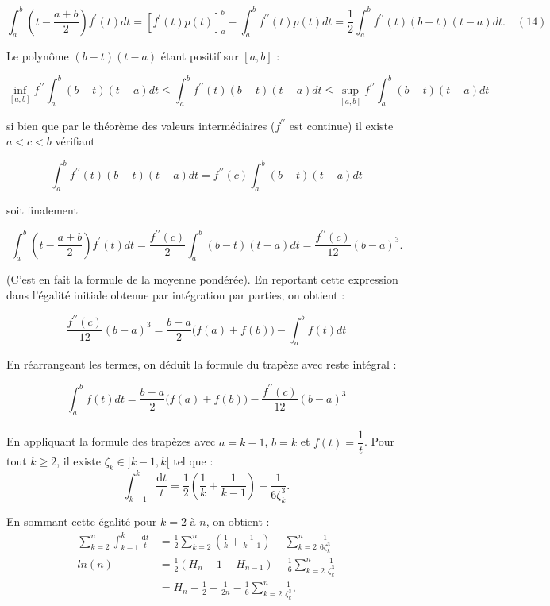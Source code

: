 \documentclass[a4paper,12pt]{article}
\begin{document}
\[
\int_{a}^{b}\left(t-\frac{a+b}{2}\right)f^{\prime}(t)dt = \left[f^{\prime}(t)p(t)\right]_{a}^{b} - \int_{a}^{b}f^{\prime\prime}(t)p(t)dt = \frac{1}{2}\int_{a}^{b}f^{\prime\prime}(t)(b-t)(t-a)dt. \quad (14)
\]

Le polynôme $(b-t)(t-a)$ étant positif sur $[a,b]$ :

\[
\inf_{[a,b]}f^{\prime\prime}\int_{a}^{b}(b-t)(t-a)dt \leq \int_{a}^{b}f^{\prime\prime}(t)(b-t)(t-a)dt \leq \sup_{[a,b]}f^{\prime\prime}\int_{a}^{b}(b-t)(t-a)dt
\]

si bien que par le théorème des valeurs intermédiaires ($f^{\prime\prime}$ est continue) il existe $a<c<b$ vérifiant

\[
\int_{a}^{b}f^{\prime\prime}(t)(b-t)(t-a)dt = f^{\prime\prime}(c)\int_{a}^{b}(b-t)(t-a)dt
\]

soit finalement

\[
\int_{a}^{b}\left(t-\frac{a+b}{2}\right)f^{\prime}(t)dt = \frac{f^{\prime\prime}(c)}{2}\int_{a}^{b}(b-t)(t-a)dt = \frac{f^{\prime\prime}(c)}{12}(b-a)^{3}.
\]



(C'est en fait la formule de la moyenne pondérée). En reportant cette expression dans l'égalité initiale obtenue par intégration par parties, on obtient :

\[
\frac{f^{\prime\prime}(c)}{12}(b-a)^3 = \frac{b-a}{2}\big(f(a)+f(b)\big) - \int_{a}^{b}f(t)dt
\]

En réarrangeant les termes, on déduit la formule du trapèze avec reste intégral :

\[
\int_{a}^{b}f(t)dt = \frac{b-a}{2}\big(f(a)+f(b)\big) - \frac{f^{\prime\prime}(c)}{12}(b-a)^3
\]  \\ 



En appliquant la formule des trapèzes avec \( a = k - 1 \), \( b = k \) et \( f(t) = \dfrac{1}{t} \). Pour tout \( k \geq 2 \), il existe \( \zeta_k \in ]k-1,k[ \) tel que :
\[
\int_{k-1}^k \frac{\mathrm{d}t}{t} = \frac{1}{2} \left( \frac{1}{k} + \frac{1}{k-1} \right) - \frac{1}{6\zeta_k^3}.
\]

En sommant cette égalité pour \( k = 2 \) à \( n \), on obtient :
\begin{align*}
\sum_{k=2}^n \int_{k-1}^k \frac{\mathrm{d}t}{t}&= \frac{1}{2} \sum_{k=2}^n \left( \frac{1}{k} + \frac{1}{k-1} \right) - \sum_{k=2}^n \frac{1}{6\zeta_k^3} \\
ln(n) &= \frac{1}{2} \left( H_n - 1 + H_{n-1} \right) - \frac{1}{6} \sum_{k=2}^n \frac{1}{\zeta_k^3} \\
&= H_n - \frac{1}{2} - \frac{1}{2n} - \frac{1}{6} \sum_{k=2}^n \frac{1}{\zeta_k^3},
\end{align*}
\end{document}
